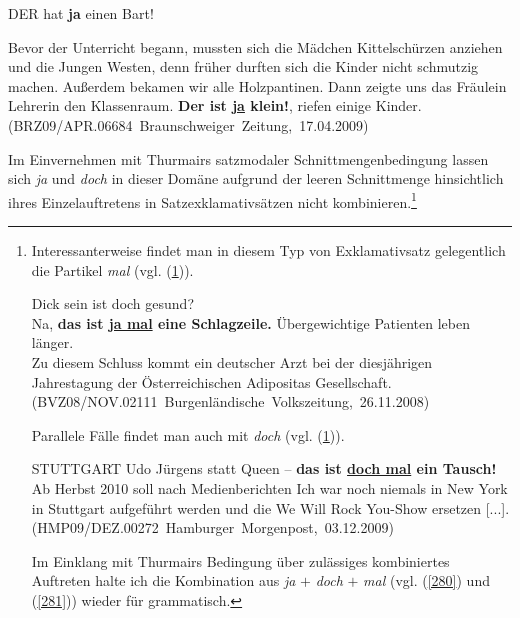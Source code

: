\begin{exe}
	\ex\label{277} 
	DER hat \textbf{ja} einen Bart!	
			\hfill\hbox {\citet[221]{Rinas2006}}
\end{exe}
\vspace{-0.65cm}
\begin{exe}
	\ex\label{278a}
	\scriptsize
	 Bevor der Unterricht begann, mussten sich die Mädchen Kittelschürzen anziehen und die Jungen Westen, denn früher durften sich die Kinder nicht 			schmutzig machen. Außerdem bekamen wir alle Holzpantinen. Dann zeigte uns das Fräulein Lehrerin den Klassenraum. \glqq \textbf{Der ist \underline{ja} 		klein!}\grqq{}, riefen einige Kinder. 
	\hfill\hbox {(BRZ09/APR.06684 Braunschweiger Zeitung, 17.04.2009)} 
\end{exe}	
Im Einvernehmen mit Thurmairs satzmodaler Schnittmengenbedingung lassen sich \textit{ja} und \textit{doch} in dieser Domäne aufgrund der leeren Schnittmenge hinsichtlich ihres Einzelauftretens in Satzexklamativsätzen nicht kombinieren.\footnote{Interessanterweise findet man in diesem Typ von Exklamativsatz gelegentlich die Partikel \textit{mal} (vgl. (\ref{278})).

\begin{exe}
	\ex\label{278} 
	Dick sein ist doch gesund?\\
	Na, \textbf{das ist \underline{ja mal} eine Schlagzeile.} \glqq Übergewichtige Patienten leben länger\grqq{}.\\ Zu diesem Schluss kommt ein deutscher 		Arzt bei der diesjährigen Jahrestagung der \glqq Österreichischen Adipositas Gesellschaft\grqq{}. 	
	\newline
	\hbox{}\hfill\hbox {(BVZ08/NOV.02111 Burgenländische Volkszeitung, 26.11.2008)}
\end{exe}
Parallele Fälle findet man auch mit \textit{doch} (vgl. (\ref{279})).

\begin{exe}
	\ex\label{279} 
	STUTTGART Udo Jürgens statt Queen – \textbf{das ist \underline{doch mal} ein Tausch!} Ab Herbst 2010 soll nach Medienberichten \glqq Ich war noch 			niemals in New York\grqq{} in Stuttgart aufgeführt werden und die \glqq We Will Rock You\grqq{}-Show ersetzen [...].      	
	\newline
	\hbox{}\hfill\hbox {(HMP09/DEZ.00272 Hamburger Morgenpost, 03.12.2009)}
\end{exe}					             
Im Einklang mit Thurmairs Bedingung über zulässiges kombiniertes Auftreten halte ich die Kombination aus \textit{ja} $\plus$ \textit{doch} $\plus$ \textit{mal} (vgl. (\ref{280}) und (\ref{281})) wieder für grammatisch.

}
